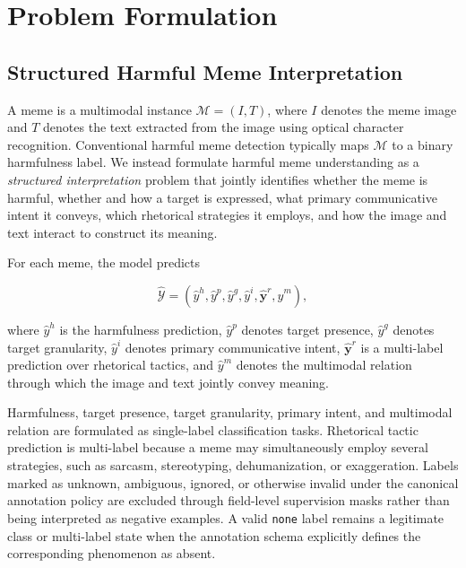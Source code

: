 \section{Problem Formulation}
\label{sec:problem}

\subsection{Structured Harmful Meme Interpretation}
\label{sec:problem:task}

A meme is a multimodal instance
$\mathcal{M}=(I,T)$, where $I$ denotes the meme image and
$T$ denotes the text extracted from the image using optical
character recognition.
Conventional harmful meme detection typically maps
$\mathcal{M}$ to a binary harmfulness label.
We instead formulate harmful meme understanding as a
\emph{structured interpretation} problem that jointly identifies
whether the meme is harmful, whether and how a target is expressed,
what primary communicative intent it conveys, which rhetorical
strategies it employs, and how the image and text interact to
construct its meaning.

For each meme, the model predicts

\begin{equation}
\hat{\mathcal{Y}}
=
\left(
\hat{y}^{h},
\hat{y}^{p},
\hat{y}^{g},
\hat{y}^{i},
\hat{\mathbf{y}}^{r},
\hat{y}^{m}
\right),
\label{eq:structured_output}
\end{equation}

where $\hat{y}^{h}$ is the harmfulness prediction,
$\hat{y}^{p}$ denotes target presence,
$\hat{y}^{g}$ denotes target granularity,
$\hat{y}^{i}$ denotes primary communicative intent,
$\hat{\mathbf{y}}^{r}$ is a multi-label prediction over rhetorical
tactics, and $\hat{y}^{m}$ denotes the multimodal relation through
which the image and text jointly convey meaning.

Harmfulness, target presence, target granularity, primary intent,
and multimodal relation are formulated as single-label
classification tasks.
Rhetorical tactic prediction is multi-label because a meme may
simultaneously employ several strategies, such as sarcasm,
stereotyping, dehumanization, or exaggeration.
Labels marked as unknown, ambiguous, ignored, or otherwise invalid
under the canonical annotation policy are excluded through
field-level supervision masks rather than being interpreted as
negative examples.
A valid \texttt{none} label remains a legitimate class or
multi-label state when the annotation schema explicitly defines the
corresponding phenomenon as absent.

